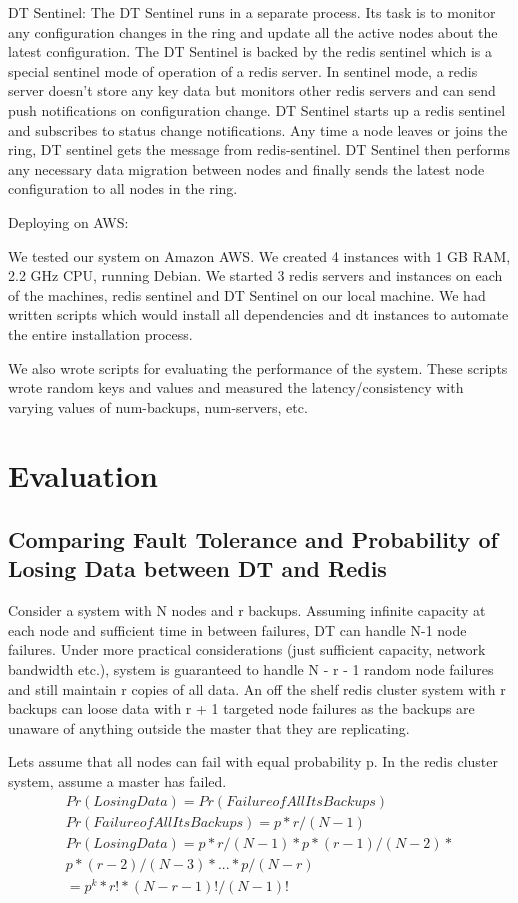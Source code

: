 \documentclass[10pt,twocolumn,letterpaper]{article}
\begin{document}
DT Sentinel: The DT Sentinel runs in a separate process. Its task is to monitor any configuration changes in the ring and update all the active nodes about the latest configuration. The DT Sentinel is backed by the redis sentinel which is a special sentinel mode of operation of a redis server. In sentinel mode, a redis server doesn't store any key data but monitors other redis servers and can send push notifications on configuration change. DT Sentinel starts up a redis sentinel and subscribes to status change notifications. Any time a node leaves or joins the ring, DT sentinel gets the message from redis-sentinel. DT Sentinel then performs any necessary data migration between nodes and finally sends the latest node configuration to all nodes in the ring.

Deploying on AWS:

We tested our system on Amazon AWS. We created 4 instances with 1 GB RAM, 2.2 GHz CPU, running Debian. We started 3 redis servers and instances on each of the machines, redis sentinel  and DT Sentinel on our local machine. We had written scripts which would install all dependencies and dt instances to automate the entire installation process.

We also wrote scripts for evaluating the performance of the system. These scripts wrote random keys and values and measured the latency/consistency with varying values of num-backups, num-servers, etc.


\section{Evaluation} \label{evaluation}

\subsection{Comparing Fault Tolerance and Probability of Losing Data between DT and Redis}
Consider a system with N nodes and r backups. Assuming infinite capacity at each node and sufficient time in between failures, DT can handle N-1 node failures. Under more practical considerations (just sufficient capacity, network bandwidth etc.), system is guaranteed to handle N - r - 1 random node failures and still maintain r copies of all data.
An off the shelf redis cluster system with r backups can loose data with r + 1 targeted node failures as the backups are unaware of anything outside the master that they are replicating.

Lets assume that all nodes can fail with equal probability p. In the redis cluster system, assume a master has failed. 
\begin{equation}
\label{xx}
\begin{split}
Pr(Losing Data) = Pr(Failure of All Its Backups)\\
Pr(Failure of All Its Backups) = p* r / (N - 1)\\
Pr(Losing Data) = p*r/(N-1) * p*(r-1)/(N-2) *\\
 p*(r-2)/(N-3) * ... * p/(N-r)\\
=p^{k}*r!*(N-r-1)!/(N-1)!\\
\end{split}
\end{equation}
\end{document}

